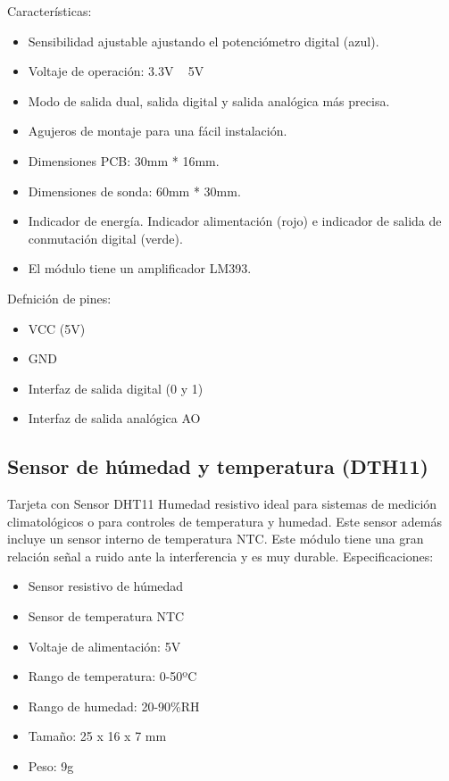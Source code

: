\documentclass{article}
\begin{document}
Características:

\begin{itemize}
	\item Sensibilidad ajustable ajustando el potenciómetro digital (azul).
	\item Voltaje de operación: 3.3V ~ 5V
	\item Modo de salida dual, salida digital y salida analógica más precisa.
	\item Agujeros de montaje para una fácil instalación.
	\item Dimensiones PCB: 30mm * 16mm.
	\item Dimensiones de sonda: 60mm * 30mm.
	\item Indicador de energía. Indicador alimentación (rojo) e indicador de salida de conmutación digital (verde).
	\item El módulo tiene un amplificador LM393.
\end{itemize}

Defnición de pines:

\begin{itemize}
	\item VCC (5V)
	\item GND
	\item Interfaz de salida digital (0 y 1) 
	\item Interfaz de salida analógica AO
\end{itemize}

\subsection{Sensor de húmedad  y temperatura (DTH11)}
Tarjeta con Sensor DHT11 Humedad resistivo ideal para sistemas de medición climatológicos o para controles de temperatura y humedad. Este sensor además incluye un sensor interno de temperatura NTC. Este módulo tiene una gran relación señal a ruido ante la interferencia y es muy durable.
Especificaciones:

\begin{itemize}
	\item Sensor resistivo de húmedad
	\item Sensor de temperatura NTC
	\item Voltaje de alimentación: 5V
	\item Rango de temperatura: 0-50ºC
	\item Rango de humedad: 20-90{\%}RH
	\item Tamaño: 25 x 16 x 7 mm
	\item Peso: 9g
\end{itemize}
\end{document}
